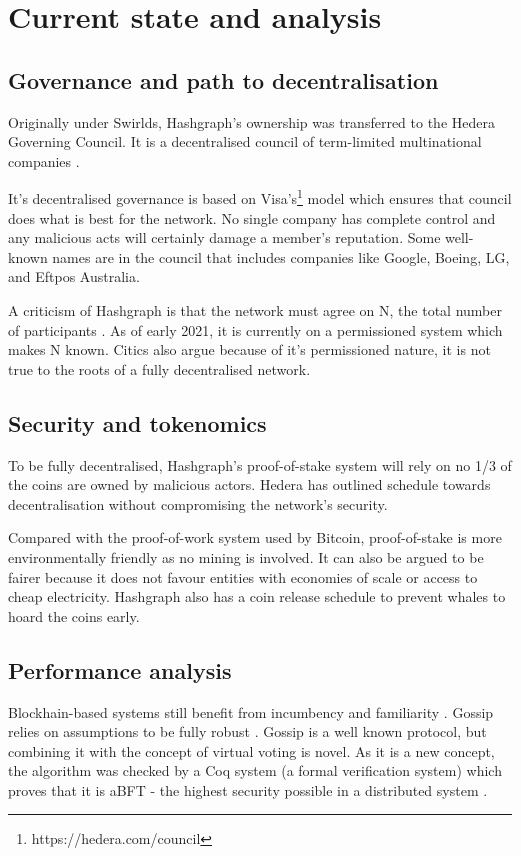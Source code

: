 \section{Current state and analysis}

\subsection{Governance and path to decentralisation}
Originally under Swirlds, Hashgraph's ownership was transferred to the Hedera Governing Council. It is a decentralised council of term-limited multinational companies \cite{baird2018hedera}. 

It's decentralised governance is based on Visa's\footnote{https://hedera.com/council} model which ensures that council does what is best for the network. No single company has complete control and any malicious acts will certainly damage a member's reputation. Some well-known names are in the council that includes companies like Google, Boeing, LG, and Eftpos Australia. 

A criticism of Hashgraph is that the network must agree on N, the total number of participants \cite{kauflin2018}. As of early 2021, it is currently on a permissioned system which makes N known. Citics also argue because of it's permissioned nature, it is not true to the roots of a fully decentralised network.


\subsection{Security and tokenomics}
To be fully decentralised, Hashgraph's proof-of-stake system will rely on no 1/3 of the coins are owned by malicious actors. Hedera has outlined schedule towards decentralisation without compromising the network's security.

Compared with the proof-of-work system used by Bitcoin, proof-of-stake is more environmentally friendly as no mining is involved. It can also be argued to be fairer because it does not favour entities with economies of scale or access to cheap electricity. Hashgraph also has a coin release schedule to prevent whales to hoard the coins early.%

\subsection{Performance analysis}
Blockhain-based systems still benefit from incumbency and familiarity \cite{khariff2018}. Gossip relies on assumptions to be fully robust \cite{alvisi}. Gossip is a well known protocol, but combining it with the concept of virtual voting is novel. As it is a new concept, the algorithm was checked by a Coq system (a formal verification system) which proves that it is aBFT - the highest security possible in a distributed system \cite{coq2018}.

